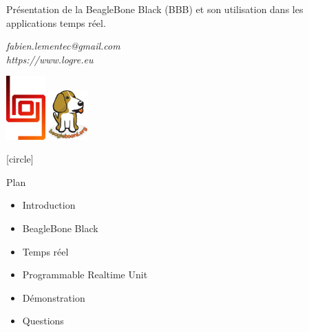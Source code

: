 \documentclass{beamer}
\begin{document}
\begin{frame}{}
\begin{center}
Pr\'{e}sentation de la BeagleBone Black (BBB) et son utilisation dans
les applications temps r\'eel.
\end{center}

\begin{center}
  \begin{tiny}
    \textit{fabien.lementec@gmail.com}\\
    \textit{https://www.logre.eu}
  \end{tiny}
\end{center}

\vspace{2.00mm}
\begin{center}
\includegraphics[width=15mm]{pic/log_logo.png}
\hspace{10.00mm}
\includegraphics[width=15mm]{pic/bbb_logo.png}
\end{center}
\end{frame}


[circle]


\begin{frame}{Plan}
  \begin{itemize}
  \item Introduction
  \item BeagleBone Black
  \item Temps r\'eel
  \item Programmable Realtime Unit
  \item D\'emonstration
  \item Questions
  \end{itemize}
\end{frame}
\end{document}
